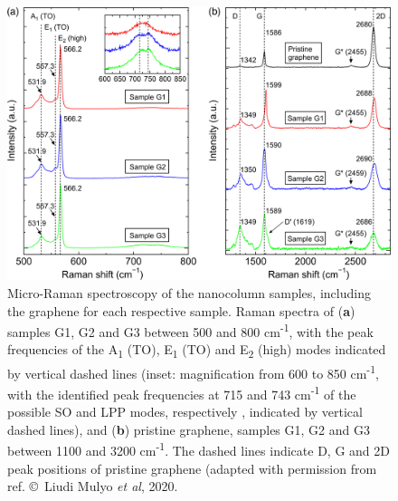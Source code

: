 \begin{figure}[H]
    \centering
    \includegraphics[width=\textwidth]{figures/paper-iv/fig-8.png}
    \caption[Micro-Raman spectroscopy of the nanocolumn samples,\newline including the graphene for each respective sample]{Micro-Raman spectroscopy of the nanocolumn samples, including the graphene for each respective sample. Raman spectra of (\textbf{a}) samples G1, G2 and G3 between 500 and 800 cm\textsuperscript{-1}, with the peak frequencies of the A\textsubscript{1} (TO), E\textsubscript{1} (TO) and E\textsubscript{2} (high) modes indicated by vertical dashed lines (inset: magnification from 600 to 850 cm\textsuperscript{-1}, with the identified peak frequencies at 715 and 743 cm\textsuperscript{-1} of the possible SO and LPP modes, respectively \cite{2016robins,2009jeganathan}, indicated by vertical dashed lines), and (\textbf{b}) pristine graphene, samples G1, G2 and G3 between 1100 and 3200 cm\textsuperscript{-1}. The dashed lines indicate D, G and 2D peak positions of pristine graphene (adapted with permission from ref.  \copyright \ Liudi Mulyo \textit{et al}, 2020.}
    \label{fig:figures/paper-iv/fig-8}
\end{figure}


\clearpage
{}
\specialsection
\headerspecialsection

{\hypersetup{urlcolor=ntnu,linkcolor=sophia} %


}

